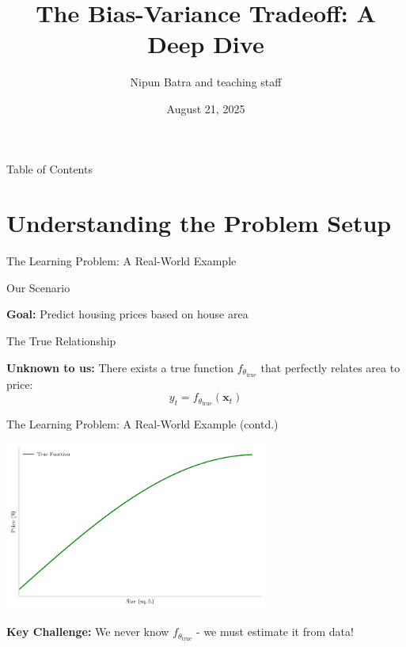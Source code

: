 \documentclass[10pt]{beamer}
\title{The Bias-Variance Tradeoff: A Deep Dive}
\date{August 21, 2025}
\author{Nipun Batra and teaching staff}
\institute{IIT Gandhinagar}
\newcommand{\fitpic}[1]{\begin{adjustbox}{max width=\linewidth, max totalheight=0.78\textheight}#1\end{adjustbox}}
\begin{document}
\maketitle

\begin{frame}{Table of Contents}
\tableofcontents
\end{frame}

\section{Understanding the Problem Setup}


\begin{frame}{The Learning Problem: A Real-World Example}
\footnotesize
\begin{definitionbox}{Our Scenario}
\raggedright
\textbf{Goal:} Predict housing prices based on house area
\end{definitionbox}

\begin{examplebox}{The True Relationship}
\raggedright
\textbf{Unknown to us:} There exists a true function $f_{\theta_{\text{true}}}$ that perfectly relates area to price:
$$y_t = f_{\theta_{\text{true}}}(\mathbf{x}_t)$$
\end{examplebox}
\end{frame}

\begin{frame}{The Learning Problem: A Real-World Example (contd.)}
\footnotesize
\begin{center}
\fitpic{\includegraphics[width=0.65\textwidth]{../assets/bias-variance/figures/true_latexify.pdf}}
\end{center}

\begin{keypointsbox}
\raggedright
\textbf{Key Challenge:} We never know $f_{\theta_{\text{true}}}$ - we must estimate it from data!
\end{keypointsbox}
\end{frame}
\end{document}
